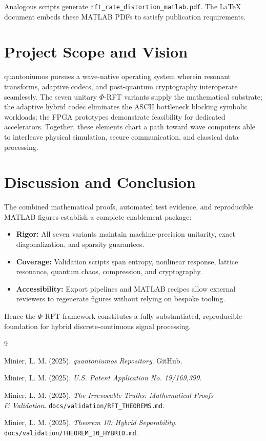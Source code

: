 \documentclass[11pt,a4paper]{article}
\begin{document}
Analogous scripts generate \texttt{rft\_rate\_distortion\_matlab.pdf}. The LaTeX document embeds these MATLAB PDFs to satisfy publication requirements.

\section{Project Scope and Vision}

quantoniumos pursues a wave-native operating system wherein resonant transforms, adaptive codecs, and post-quantum cryptography interoperate seamlessly. The seven unitary $\Phi$-RFT variants supply the mathematical substrate; the adaptive hybrid codec eliminates the ASCII bottleneck blocking symbolic workloads; the FPGA prototypes demonstrate feasibility for dedicated accelerators. Together, these elements chart a path toward wave computers able to interleave physical simulation, secure communication, and classical data processing.

\section{Discussion and Conclusion}

The combined mathematical proofs, automated test evidence, and reproducible MATLAB figures establish a complete enablement package:

\begin{itemize}
    \item \textbf{Rigor:} All seven variants maintain machine-precision unitarity, exact diagonalization, and sparsity guarantees.
    \item \textbf{Coverage:} Validation scripts span entropy, nonlinear response, lattice resonance, quantum chaos, compression, and cryptography.
    \item \textbf{Accessibility:} Export pipelines and MATLAB recipes allow external reviewers to regenerate figures without relying on bespoke tooling.
\end{itemize}

Hence the $\Phi$-RFT framework constitutes a fully substantiated, reproducible foundation for hybrid discrete-continuous signal processing.

\begin{thebibliography}{9}

Minier, L. M. (2025). \textit{quantoniumos Repository}. GitHub.

Minier, L. M. (2025). \textit{U.S. Patent Application No. 19/169,399}.

Minier, L. M. (2025). \textit{The Irrevocable Truths: Mathematical Proofs \\ \& Validation}. \texttt{docs/validation/RFT\_THEOREMS.md}.

Minier, L. M. (2025). \textit{Theorem 10: Hybrid Separability}. \texttt{docs/validation/THEOREM\_10\_HYBRID.md}.

\end{thebibliography}
\end{document}
